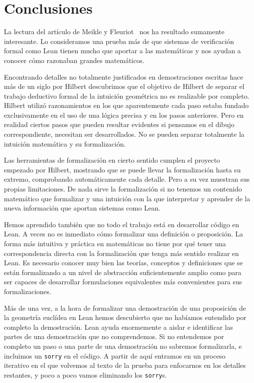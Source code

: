 \section{Conclusiones}

La lectura del artículo de Meikle y
Fleuriot~\cite{meikleFormalizingHilbertGrundlagen2003} nos ha resultado
sumamente interesante. Lo consideramos una prueba más de que sistemas de
verificación formal como Lean tienen mucho que aportar a las matemáticas
y nos ayudan a conocer cómo razonaban grandes matemáticos.

Encontrando detalles no totalmente justificados en demostraciones escritas hace
más de un siglo por Hilbert descubrimos que el objetivo de Hilbert de separar el
trabajo deductivo formal de la intuición geométrica no es realizable por
completo. Hilbert utilizó razonamientos en los que aparentemente cada paso
estaba fundado exclusivamente en el uso de una lógica precisa y en los pasos
anteriores. Pero en realidad ciertos pasos que pueden resultar
evidentes si pensamos en el dibujo correspondiente, necesitan ser desarrollados.
No se pueden separar totalmente la intuición matemática y su formalización.

Las herramientas de formalización en cierto sentido cumplen el proyecto
empezado por Hilbert, mostrando que se puede llevar la
formalización hasta su extremo, comprobando automáticamente cada detalle. Pero a
su vez muestran sus propias limitaciones. De nada sirve la formalización si no
tenemos un contenido matemático que formalizar y una intuición con la que
interpretar y aprender de la nueva información que aportan sistemas como Lean.

Hemos aprendido también que no todo el trabajo está en desarrollar código en
Lean. A veces no es inmediato cómo formalizar una definición o proposición. La
forma más intuitiva y práctica en matemáticas no tiene por qué tener una
correspondencia directa con la formalización que tenga más sentido realizar en
Lean. Es necesario conocer muy bien las teorías, conceptos y definiciones que
se están formalizando a un nivel de abstracción suficientemente amplio como
para ser capaces de desarrollar formulaciones equivalentes más convenientes para
sus formalizaciones.

Más de una vez, a la hora de formalizar una demostración de una proposición de
la geometría euclídea en Lean hemos descubierto que no habíamos
entendido por completo la demostración. Lean ayuda enormemente a aislar
e identificar las partes de una demostración que no comprendemos. Si no
entendemos por completo un paso o una parte de una demostración no sabremos
formalizarla, e incluimos un \lstinline{sorry} en el código. A partir de aquí
entramos en un proceso iterativo en el que volvemos al texto de la prueba para
enfocarnos en los detalles restantes, y poco a poco vamos eliminando los
\lstinline{sorry}s.

